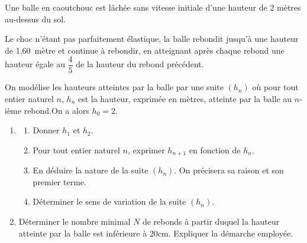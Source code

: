 \medskip

Une balle en caoutchouc est lâchée sans vitesse initiale d'une hauteur de 2 mètres au-dessus du sol.

Le choc n'étant pas parfaitement élastique, la balle rebondit jusqu'à une hauteur de
1,60~mètre et continue à rebondir, en atteignant après chaque rebond une hauteur égale au
$\dfrac{4}{5}$ de la hauteur du rebond précédent.

On modélise les hauteurs atteintes par la balle par une suite $\left(h_n\right)$ où pour tout entier naturel $n$, $h_n$ est la hauteur, exprimée en mètres, atteinte par la balle au $n$-ième  rebond.On a alors $h_0 = 2$.

\medskip

\begin{enumerate}
\item 
	\begin{enumerate}
		\item Donner $h_1$ et $h_2$.
		\item Pour tout entier naturel $n$, exprimer $h_{n+1}$ en fonction de $h_n$.
		\item En déduire la nature de la suite $\left(h_n\right)$. On précisera sa raison et son premier terme. 
		\item Déterminer le sens de variation de la suite $\left(h_n\right)$.
	\end{enumerate}
\item  Déterminer le nombre minimal $N$ de rebonds à partir duquel la hauteur atteinte par la balle est inférieure à $20$cm. Expliquer la démarche employée.
\end{enumerate}

\bigskip
